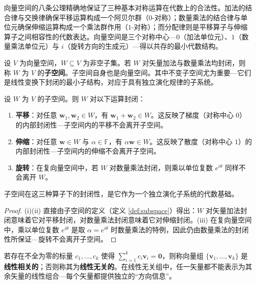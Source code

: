\begin{remark}[向量空间的对称性起源]\label{rem:vector_space_symmetry}
向量空间的八条公理精确地保证了三种基本对称运算在代数上的合法性。加法的结合律与交换律确保平移运算构成一个阿贝尔群（$0$-对称）；数量乘法的结合律与单位元确保伸缩运算构成一个乘法群作用（$1$-对称）；而分配律则是平移算子与伸缩算子之间相容性的代数表达。向量空间是三个对称中心---$0$（加法单位元）、$1$（数量乘法单位元）与 $i$（旋转方向的生成元）---得以共存的最小代数结构。
\end{remark}

\begin{definition}[子空间]\label{def:subspace}
设 $V$ 为向量空间，$W \subseteq V$ 为非空子集。若 $W$ 对矢量加法与数量乘法均封闭，则称 $W$ 为 $V$ 的\textbf{子空间}。子空间自身也是向量空间。其中不变子空间尤为重要---它们是线性变换下封闭的最小子结构，对应于具有独立演化规律的子系统。
\end{definition}

\begin{proposition}[子空间在平移与伸缩下的封闭性]\label{prop:subspace_closure_symmetry}
设 $W$ 为 $V$ 的子空间。则 $W$ 对以下运算封闭：
\begin{enumerate}[label=(\roman*)]
    \item \textbf{平移}：对任意 $\mathbf{w}_1, \mathbf{w}_2 \in W$，有 $\mathbf{w}_1 + \mathbf{w}_2 \in W$。这反映了梯度（对称中心 $0$）的内部封闭性---子空间内的平移不会离开子空间。
    \item \textbf{伸缩}：对任意 $\mathbf{w} \in W$ 与 $\alpha \in \mathbb{F}$，有 $\alpha \mathbf{w} \in W$。这反映了散度（对称中心 $1$）的内部封闭性---子空间内的伸缩不会离开子空间。
    \item \textbf{旋转}：在复向量空间中，若 $W$ 对数量乘法封闭，则乘以单位复数 $e^{i\theta}$ 同样不会离开 $W$。
\end{enumerate}
子空间在这三种算子下的封闭性，是它作为一个独立演化子系统的代数基础。
\end{proposition}

\begin{proof}
(i)(ii) 直接由子空间的定义（定义 \ref{def:subspace}）得出：$W$ 对矢量加法封闭意味着它对平移封闭，对数量乘法封闭意味着它对伸缩封闭。(iii) 在复向量空间中，乘以单位复数 $e^{i\theta}$ 是取 $\alpha = e^{i\theta}$ 时数量乘法的特例，因此仍由数量乘法的封闭性所保证---旋转不会离开子空间。
\end{proof}

\begin{definition}[线性相关与线性无关]\label{def:linear_dependence}
若存在不全为零的标量 $c_1, \dots, c_k$ 使得 $\sum_{i=1}^k c_i \mathbf{v}_i = \mathbf{0}$，则称向量组 $\{\mathbf{v}_1, \dots, \mathbf{v}_k\}$ 是\textbf{线性相关的}；否则称其为\textbf{线性无关的}。在线性无关组中，任一矢量都不能表示为其余矢量的线性组合---每个矢量都提供独立的“方向信息”。
\end{definition}

